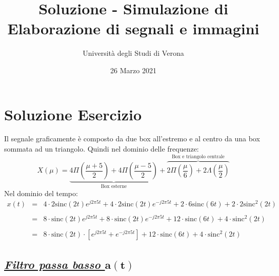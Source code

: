 \documentclass[a4paper]{article}
\begin{document}
	\author{Università degli Studi di Verona}
	\title{Soluzione - Simulazione di Elaborazione di segnali e immagini}
	\date{{\Large 26 Marzo 2021}}
	\maketitle
	
	\section{Soluzione Esercizio}
	
	Il segnale graficamente è composto da due box all'estremo e al centro da una box sommata ad un triangolo. Quindi nel dominio delle frequenze:
	\begin{equation*}
		X\left(\mu\right) = \underbrace{4\Pi\left(\dfrac{\mu + 5}{2}\right) + 4\Pi\left(\dfrac{\mu - 5}{2}\right)}_{\text{Box esterne}} + \overbrace{2\Pi\left(\dfrac{\mu}{6}\right) + 2\Lambda\left(\dfrac{\mu}{2}\right)}^{\text{Box e triangolo centrale}}
	\end{equation*}
	Nel dominio del tempo:
	\begin{equation*}
		\begin{array}{lll}
			x\left(t\right) & = & 4 \cdot 2 \mathrm{sinc}\left(2t\right) e^{j 2 \pi 5 t} + 4 \cdot 2 \mathrm{sinc}\left(2t\right) e^{-j 2 \pi 5 t} + 2 \cdot 6\mathrm{sinc}\left(6t\right) + 2 \cdot 2\mathrm{sinc}^{2}\left(2t\right) \\
			\\
			& = & 8\cdot\mathrm{sinc}\left(2t\right) e^{j 2 \pi 5 t} + 8\cdot\mathrm{sinc}\left(2t\right) e^{-j 2 \pi 5 t} + 12\cdot\mathrm{sinc}\left(6t\right) + 4\cdot\mathrm{sinc}^{2}\left(2t\right) \\
			\\
			& = & 8 \cdot \mathrm{sinc}\left(2t\right) \cdot \left[e^{j 2 \pi 5 t} + e^{-j 2 \pi 5 t}\right] + 12\cdot\mathrm{sinc}\left(6t\right) + 4\cdot\mathrm{sinc}^{2}\left(2t\right)
		\end{array}
	\end{equation*}\newpage
	
	\subsection*{\textcolor{Green4}{\textbf{\emph{\underline{Filtro passa basso $\boldsymbol{a\left(t\right)}$}}}}}
	
\end{document}
